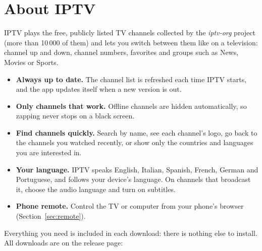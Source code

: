 \newcommand{\GuideLang}{english}
\newcommand{\GuideTitle}{Quick Start Guide}
\newcommand{\TipLabel}{Tip.}




\section{About IPTV}

IPTV plays the free, publicly listed TV channels collected by the
\emph{iptv-org} project (more than 10\,000 of them) and lets you switch
between them like on a television: channel up and down, channel numbers,
favorites and groups such as News, Movies or Sports.

\begin{itemize}
  \item \textbf{Always up to date.} The channel list is refreshed each time
        IPTV starts, and the app updates itself when a new version is out.
  \item \textbf{Only channels that work.} Offline channels are hidden
        automatically, so zapping never stops on a black screen.
  \item \textbf{Find channels quickly.} Search by name, see each channel's
        logo, go back to the channels you watched recently, or show only the
        countries and languages you are interested in.
  \item \textbf{Your language.} IPTV speaks English, Italian, Spanish,
        French, German and Portuguese, and follows your device's language.
        On channels that broadcast it, choose the audio language and turn on
        subtitles.
  \item \textbf{Phone remote.} Control the TV or computer from your phone's
        browser (Section~\ref{sec:remote}).
\end{itemize}

Everything you need is included in each download: there is nothing else to
install. All downloads are on the release page:

\begin{center}
  \download
\end{center}


